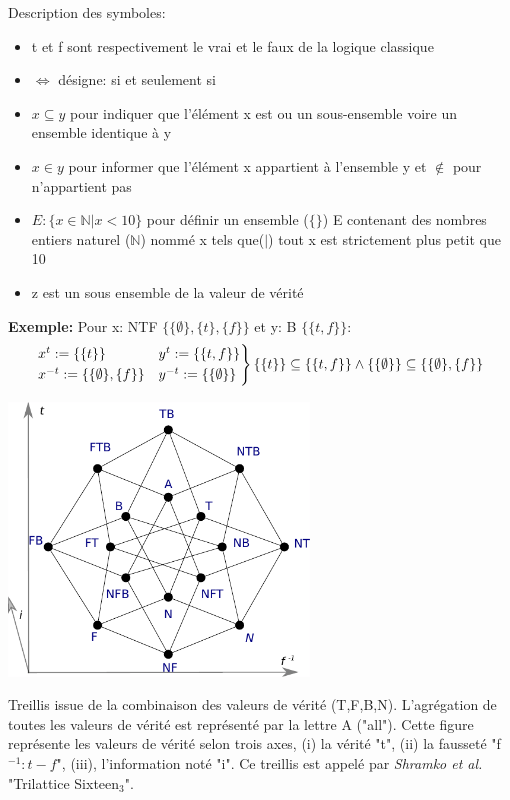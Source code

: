 \begin{refsegment}
    Description des symboles:\nolisttopbreak
    \begin{itemize}
        \item t et f sont respectivement le vrai et le faux de la logique classique
        \item $\iff$ désigne: si et seulement si
        \item $x \subseteq y$ pour indiquer que  l'élément x est ou un sous-ensemble voire un ensemble identique à y
        \item $x \in y$ pour informer que l'élément x appartient à l'ensemble y et  $\notin$ pour n'appartient pas
        \item $E : \{ x \in \mathbb{N} | x < 10 \}$ pour définir un ensemble ($\{\}$) E contenant des nombres entiers naturel ($\mathbb{N}$) nommé x tels que($|$) tout x est strictement plus petit que 10
        \item z est un sous ensemble de la valeur de vérité
    \end{itemize}

    \textbf{Exemple:} Pour x: NTF $\{\{\emptyset\},\{t\},\{f\}\}$ et y: B $\{\{t,f\}\}$:\nolisttopbreak \vspace{-0.5cm}
    \begin{equation*}
    \begin{rcases}
    x^{t}  := \{ \{t\} \}               &y^{t}  := \{ \{t,f\} \}\\
    x^{-t} := \{\{\emptyset\},\{f\} \}  &y^{-t} := \{ \{\emptyset\} \} \\
    \end{rcases}
     \{ \{t\} \} \subseteq \{ \{t,f\} \} \land \{ \{\emptyset\} \} \subseteq \{\{\emptyset\},\{f\} \}
    \end{equation*}


    \begin{shadedfigure}
        \centering
        \includegraphics[width=0.6\textwidth]{img/Generalized_Truth_Values_and_Multilattices.pdf}
        \caption{ Treillis issue de la combinaison des valeurs de vérité (T,F,B,N). L'agrégation de toutes les valeurs de vérité est représenté par la lettre A ("all"). Cette figure représente les valeurs de vérité selon trois axes, (i) la vérité "t", (ii) la fausseté "f$^{-1}: t -f $", (iii), l'information noté "i". Ce treillis est appelé par \textit{Shramko et al.} "Trilattice Sixteen$_{3}$".  }
        \label{fig:sixteen_truth_values}
    \end{shadedfigure}


\end{refsegment}
